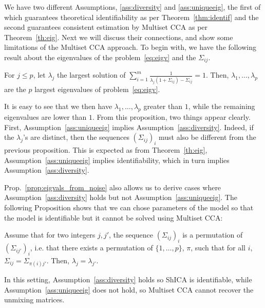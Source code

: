 We have two different Assumptions, \ref{ass:diversity} and \ref{ass:uniqueeig}, the first of which guarantees theoretical identifiability as per Theorem~\ref{thm:identif} and the second guarantees consistent estimation by Multiset CCA as per Theorem~\ref{th:eig}. Next we will discuss their connections, and show some limitations of the Multiset CCA approach. To begin with, we have the following result about the eigenvalues of the problem~\eqref{eq:eigv} and the $\Sigma_{ij}$.
\begin{prop}
  \label{prop:eigvals_from_noise}
  For $j\leq p$, let $\lambda_j$ the largest solution of $ \sum_{i=1}^m\frac{1}{\lambda_j(1 + \Sigma_{ij}) -\Sigma_{ij}}=1$. Then, $\lambda_1, \dots, \lambda_p$ are the $p$ largest eigenvalues of problem~\eqref{eq:eigv}.
\end{prop}
It is easy to see that we then have $\lambda_1, \dots, \lambda_p$ greater than $1$, while the remaining eigenvalues are lower than $1$.
From this proposition, two things appear clearly. First, Assumption~\ref{ass:uniqueeig} implies Assumption~\ref{ass:diversity}.
%
Indeed, if the $\lambda_j$'s are distinct, then the sequences $(\Sigma_{ij})_i$ must also be different from the previous proposition.
%
This is expected as from Theorem~\ref{th:eig}, Assumption~\ref{ass:uniqueeig} implies identifiability, which in turn implies Assumption~\ref{ass:diversity}.

Prop.~\ref{prop:eigvals_from_noise} also allows us to derive cases where Assumption~\ref{ass:diversity} holds but not Assumption~\ref{ass:uniqueeig}. The following Proposition shows that we can chose parameters of the model so that the model is identifiable but it cannot be solved using Multiset CCA:
\begin{prop}
\label{counter}
Assume that for two integers $j, j'$, the sequence $(\Sigma_{ij})_i$ is a permutation of $(\Sigma_{ij'})_i$, i.e. that there exists a permutation of $\{1,\dots, p\}$, $\pi$, such that for all $i$, $\Sigma_{ij} = \Sigma_{\pi(i)j'}$.  Then, $\lambda_j = \lambda_{j'}$.
\end{prop}
In this setting, Assumption~\ref{ass:diversity} holds so ShICA is identifiable, while Assumption~\ref{ass:uniqueeig} does not hold, so Multiset CCA cannot recover the unmixing matrices.




